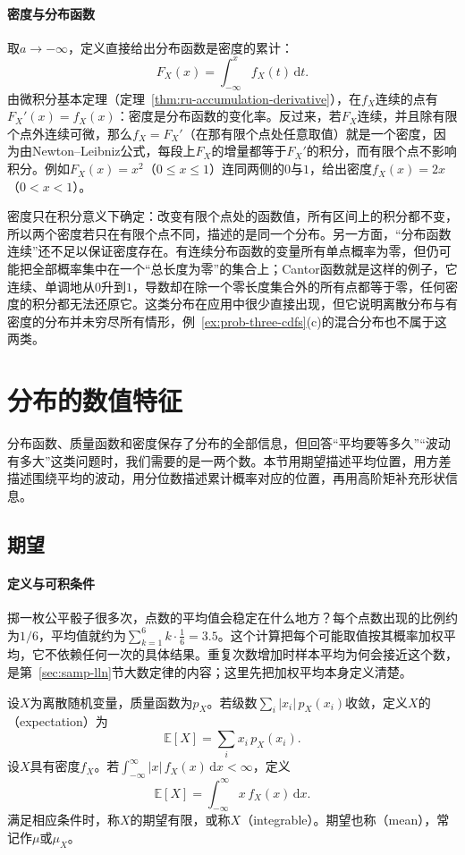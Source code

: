 \paragraph{密度与分布函数}
取$a\to-\infty$，定义直接给出分布函数是密度的累计：
\[
  F_X(x)=\int_{-\infty}^{x}f_X(t)\,\mathrm{d}t .
\]
由微积分基本定理（定理~\ref{thm:ru-accumulation-derivative}），在$f_X$连续的点有$F_X'(x)=f_X(x)$：密度是分布函数的变化率。反过来，若$F_X$连续，并且除有限个点外连续可微，那么$f_X=F_X'$（在那有限个点处任意取值）就是一个密度，因为由Newton--Leibniz公式，每段上$F_X$的增量都等于$F_X'$的积分，而有限个点不影响积分。例如$F_X(x)=x^2$（$0\leq x\leq1$）连同两侧的$0$与$1$，给出密度$f_X(x)=2x$（$0<x<1$）。

密度只在积分意义下确定：改变有限个点处的函数值，所有区间上的积分都不变，所以两个密度若只在有限个点不同，描述的是同一个分布。另一方面，“分布函数连续”还不足以保证密度存在。有连续分布函数的变量所有单点概率为零，但仍可能把全部概率集中在一个“总长度为零”的集合上；Cantor函数就是这样的例子，它连续、单调地从$0$升到$1$，导数却在除一个零长度集合外的所有点都等于零，任何密度的积分都无法还原它。这类分布在应用中很少直接出现，但它说明离散分布与有密度的分布并未穷尽所有情形，例~\ref{ex:prob-three-cdfs}(c)的混合分布也不属于这两类。

\section{分布的数值特征}
\label{sec:prob-numerical-features}

分布函数、质量函数和密度保存了分布的全部信息，但回答“平均要等多久”“波动有多大”这类问题时，我们需要的是一两个数。本节用期望描述平均位置，用方差描述围绕平均的波动，用分位数描述累计概率对应的位置，再用高阶矩补充形状信息。

\subsection{期望}
\label{sec:prob-expectation}

\paragraph{定义与可积条件}
掷一枚公平骰子很多次，点数的平均值会稳定在什么地方？每个点数出现的比例约为$1/6$，平均值就约为$\sum_{k=1}^6k\cdot\frac16=3.5$。这个计算把每个可能取值按其概率加权平均，它不依赖任何一次的具体结果。重复次数增加时样本平均为何会接近这个数，是第~\ref{sec:samp-lln}节大数定律的内容；这里先把加权平均本身定义清楚。

\begin{definition}[期望]
\label{def:prob-expectation}
设$X$为离散随机变量，质量函数为$p_X$。若级数$\sum_i|x_i|\,p_X(x_i)$收敛，定义$X$的（expectation）为
\[
  \mathbb{E}[X]=\sum_ix_i\,p_X(x_i).
\]
设$X$具有密度$f_X$。若$\int_{-\infty}^{\infty}|x|\,f_X(x)\,\mathrm{d}x<\infty$，定义
\[
  \mathbb{E}[X]=\int_{-\infty}^{\infty}x\,f_X(x)\,\mathrm{d}x .
\]
满足相应条件时，称$X$的期望有限，或称$X$（integrable）。期望也称（mean），常记作$\mu$或$\mu_X$。
\end{definition}


